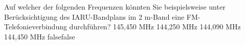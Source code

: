     {Auf welcher der folgenden Frequenzen könnten Sie beispielsweise unter Berücksichtigung des IARU-Bandplans im 2 m-Band eine FM-Telefonieverbindung durchführen?}
    {145,450 MHz}
    {144,250 MHz}
    {144,090 MHz}
    {144,450 MHz}
    {false}{false}